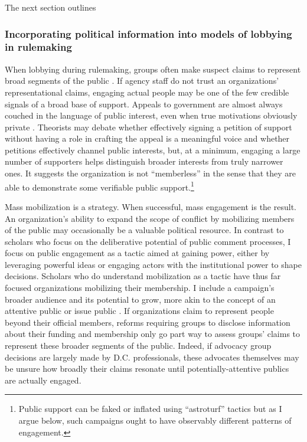 The next section outlines 

\subsubsection{Incorporating political information into models of lobbying in rulemaking}
When lobbying during rulemaking, groups often make suspect claims to represent broad segments of the public \citep{Seifter2016UCLA}. %
If agency staff do not trust an organizations' representational claims, engaging actual people may be one of the few credible signals of a broad base of support.
Appeals to government are almost always couched in the language of public interest, even when true motivations obviously private \citep{Schattschneider1975}. Theorists may debate whether effectively signing a petition of support without having a role in crafting the appeal is a meaningful voice and whether petitions effectively channel public interests, but, at a minimum, engaging a large number of supporters helps distinguish broader interests from truly narrower ones. It suggests the organization is not ``memberless'' \citep{Skocpol2003} in the sense that they are able to demonstrate some verifiable public support.\footnote{
Public support can be faked or inflated using ``astroturf'' tactics but as I argue below, such campaigns ought to have observably different patterns of engagement.}

Mass mobilization is a strategy. When successful, mass engagement is the result. An organization's ability to expand the scope of conflict by mobilizing members of the public may occasionally be a valuable political resource. 
In contrast to scholars who focus on the deliberative potential of public comment processes, I focus on public engagement as a tactic aimed at gaining power, either by leveraging powerful ideas or engaging actors with the institutional power to shape decisions.
Scholars who do understand mobilization as a tactic \citep{Furlong1997, Kerwin2011} have thus far focused organizations mobilizing their membership. %
I include a campaign's broader audience and its potential to grow, more akin to the concept of an attentive public \citep{Key1961} or issue public \citep{Converse1964}. If organizations claim to represent people beyond their official members, 
reforms requiring groups to disclose information about their funding and membership \citep{Seifter2016UCLA} only go part way to assess groups' claims to represent these broader segments of the public. Indeed, if advocacy group decisions are largely made by D.C. professionals, these advocates themselves may be unsure how broadly their claims resonate until potentially-attentive publics are actually engaged.


